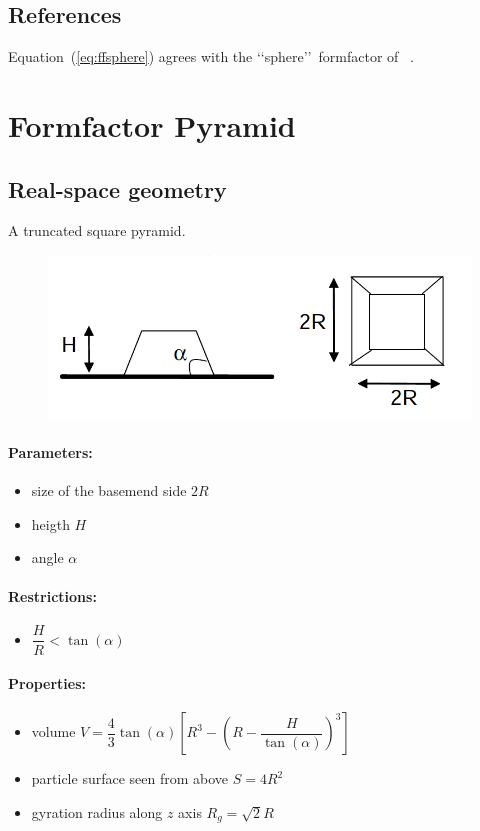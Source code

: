 \subsection{References}
Equation~(\ref{eq:ffsphere}) agrees with the \lq\lq sphere\rq\rq ~formfactor of \IsGISAXS~\cite{Laz02}.

\newpage{\cleardoublepage}
\section{Formfactor Pyramid}

\subsection{Real-space geometry}

A truncated square pyramid.
\begin{figure}[!h]
\begin{center}
\includegraphics[width=0.6\columnwidth]{Figures/pyramid}
\end{center}
\label{pyramid}
\end{figure} 
\par
\paragraph{Parameters:}
\begin{itemize}
\item size of the basemend side $2R$
\item heigth $H$
\item angle $\alpha$
\end{itemize}
\paragraph{Restrictions:}
\begin{itemize}
\item $\dfrac{H}{R} < \tan(\alpha)$
\end{itemize}
\paragraph{Properties:}
\begin{itemize}
\item volume $V=\dfrac{4}{3}\tan(\alpha)\left[R^3-\left(R-\dfrac{H}{\tan(\alpha)}\right)^3\right]$
\item particle surface seen from above $S = 4R^2$
\item gyration radius along $z$ axis $R_g = \sqrt{2}R$
\end{itemize}


